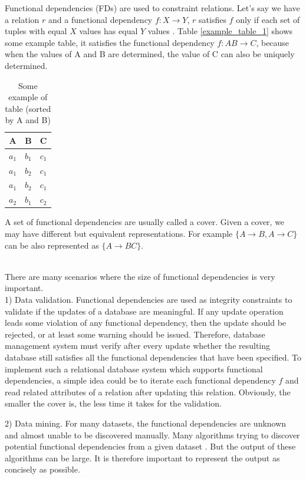 \documentclass[11pt]{book}
\begin{document}
Functional dependencies (FDs) are used to constraint relations. Let's say we have a relation $r$ and a functional dependency $f: X \rightarrow Y$, $r$ satisfies $f$ only if each set of tuples with equal $X$ values has equal $Y$ values \cite{maier1983theory}. Table \ref{example_table_1} shows some example table, it satisfies the functional dependency $f: AB \to C$, because when the values of A and B are determined, the value of C can also be uniquely determined.

\begin{table}[H]
	\centering
	
	\begin{tabular}{ c c c }
		A     & B     & C \\
		\hline
		$a_1$ & $b_1$ & $c_1$ \\
		\hdashline
		$a_1$ & $b_2$ & $c_1$ \\ 
		$a_1$ & $b_2$ & $c_1$ \\
		\hdashline		
		$a_2$ & $b_1$ & $c_2$ \\
	\end{tabular}
	
	\caption{Some example of table (sorted by A and B)}
\end{table}

A set of functional dependencies are usually called a cover. Given a cover, we may have different but equivalent representations. For example $\{ A \to B, A \to C \}$ can be also represented as $\{ A \to BC \}$.

~\\
There are many scenarios where the size of functional dependencies is very important.
~\\

1) Data validation. Functional dependencies are used as integrity constraints to validate if the updates of a database are meaningful. If any update operation leads some violation of any functional dependency, then the update should be rejected, or at least some warning should be issued. Therefore, database management system must verify after every update whether the resulting database still satisfies all the functional dependencies that have been specified. To implement such a relational database system which supports functional dependencies, a simple idea could be to iterate each functional dependency $f$ and read related attributes of a relation after updating this relation. Obviously, the smaller the cover is, the less time it takes for the validation.

2) Data mining. For many datasets, the functional dependencies are unknown and almost unable to be discovered manually. Many algorithms trying to discover potential functional dependencies from a given dataset \cite{agarwal1994fast,huhtala1999tane,novelli2001fun,yao2008mining,lopes2000efficient,wyss2001fastfds}. But the output of these algorithms can be large. It is therefore important to represent the output as concisely as possible.
\end{document}
